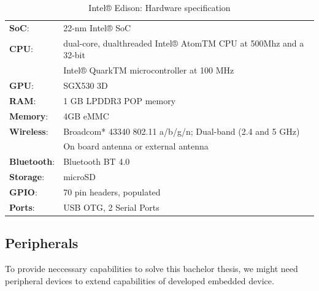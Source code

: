\begin{table}[H]
 \begin{center}
   \begin{tabular}{l l}
   \hline
   	\textbf{SoC}: & 22-nm Intel® SoC\\
	\textbf{CPU}: & dual-core, dualthreaded Intel® AtomTM CPU at 500Mhz and a 32-bit \\
   	& Intel® QuarkTM microcontroller at 100 MHz\\
	\textbf{GPU}: & SGX530 3D\\
	\textbf{RAM}: & 1 GB LPDDR3 POP memory\\
	\textbf{Memory}:& 4GB eMMC\\
	\textbf{Wireless}: & Broadcom* 43340 802.11 a/b/g/n; Dual-band (2.4 and 5 GHz)\\
	& On board antenna or external antenna \\
	\textbf{Bluetooth}: & Bluetooth BT 4.0\\
	\textbf{Storage}: & microSD\\
	\textbf{GPIO}: & 70 pin headers, populated\\
	\textbf{Ports}: & USB OTG, 2 Serial Ports\\
   \hline
   \end{tabular}
 \end{center}
 \caption{Intel® Edison: Hardware specification}
 \label{tab:tab3}
\end{table}

\subsection{Peripherals} %
\label{sub:peripherals}
To provide neccessary capabilities to solve this bachelor thesis, we might need peripheral devices to extend capabilities of developed embedded device.
